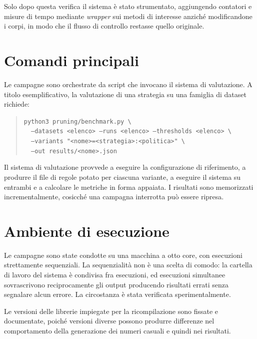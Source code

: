 Solo dopo questa verifica il sistema è stato strumentato, aggiungendo contatori e misure di tempo
mediante \emph{wrapper} sui metodi di interesse anziché modificandone i corpi, in modo che il
flusso di controllo restasse quello originale.

\section{Comandi principali}\label{sec:appendix-commands}

Le campagne sono orchestrate da script che invocano il sistema di valutazione. A titolo
esemplificativo, la valutazione di una strategia su una famiglia di dataset richiede:

\begin{quote}
\texttt{python3 pruning/benchmark.py \textbackslash}\\
\texttt{\ \ --datasets <elenco> --runs <elenco> --thresholds <elenco> \textbackslash}\\
\texttt{\ \ --variants "<nome>=<strategia>:<politica>" \textbackslash}\\
\texttt{\ \ --out results/<nome>.json}
\end{quote}

\noindent Il sistema di valutazione provvede a eseguire la configurazione di riferimento, a
produrre il file di regole potato per ciascuna variante, a eseguire il sistema su entrambi e a
calcolare le metriche in forma appaiata. I risultati sono memorizzati incrementalmente, cosicché
una campagna interrotta può essere ripresa.

\section{Ambiente di esecuzione}\label{sec:appendix-env}

Le campagne sono state condotte su una macchina a otto core, con esecuzioni strettamente
sequenziali. La sequenzialità non è una scelta di comodo: la cartella di lavoro del sistema è
condivisa fra esecuzioni, ed esecuzioni simultanee sovrascrivono reciprocamente gli output
producendo risultati errati senza segnalare alcun errore. La circostanza è stata verificata
sperimentalmente.

Le versioni delle librerie impiegate per la ricompilazione sono fissate e documentate, poiché
versioni diverse possono produrre differenze nel comportamento della generazione dei numeri
casuali e quindi nei risultati.
